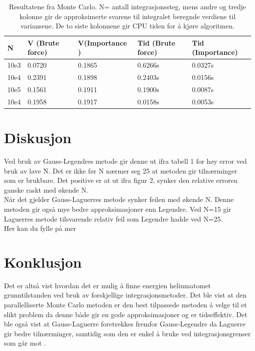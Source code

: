 \documentclass[%
oneside,                 %
final,                   %
10pt]{article}
\begin{document}
\begin{table}[H]
\begin{tabular}{l|ll|ll}
\hline
N  & V (Brute force) & V(Importance )  & Tid (Brute force) & Tid (Importance)\\
\hline
10e3  & 0.0720 & 0.1865 & 0.6266s & 0.0327s \\
\hline
10e4  & 0.2391 & 0.1898 & 0.2403s & 0.0156s\\
\hline
10e5  & 0.1561 & 0.1911 & 0.1900s & 0.0087s\\
\hline
10e4  & 0.1958 & 0.1917 & 0.0158s & 0.0053s \\
\end{tabular}
\caption{Resultatene fra Monte Carlo. N= antall integrasjonssteg, mens andre og tredje kolonne gir de approksimerte svarene til integralet beregnde verdiene til variansene. De to siste kolonnene gir CPU tiden for å kjøre algoritmen.}
\end{table}

\section{Diskusjon}
\noindent Ved bruk av Gauss-Legendres metode gir denne ut ifra tabell 1 for høy error ved bruk av lave N. Det er ikke før N nærmer seg 25 at metoden gir tilnærminger som er brukbare. Det positive er at ut ifra figur 2, synker den relative erroren ganske raskt med økende N.\\
\newline\noindent Når det gjelder Gauss-Laguerres metode synker feilen med økende N. Denne metoden gir også mye bedre approksimasjoner enn Legendre. Ved N=15 gir Laguerres metode tilsvarende relativ feil som Legendre hadde ved N=25.\\
\newline\noindent Her kan du fylle på mer
\section{Konklusjon}
\noindent Det er altså vist hvordan det er mulig å finne energien heliumatomet grunntilstanden ved bruk av forskjellige integrasjonsmetoder. Det ble vist at den parallelliserte Monte Carlo metoden er den best tilpassede metoden å velge til et slikt problem da denne både gir en gode approksimasjoner og er tidseffektiv. Det ble også vist at Gauss-Laguerre foretrekkes fremfor Gauss-Legendre da Laguerre gir bedre tilnærminger, samtidig som den er enkel å bruke ved integrasjonsgrenser som går mot \infty.
\end{document}

